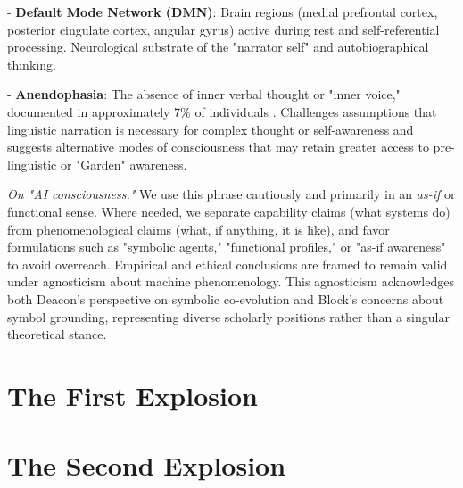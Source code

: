 \documentclass[12pt,letterpaper]{book}
\begin{document}
- \textbf{Default Mode Network (DMN)}: Brain regions (medial prefrontal cortex, posterior cingulate cortex, angular gyrus) active during rest and self-referential processing. Neurological substrate of the "narrator self" and autobiographical thinking.

- \textbf{Anendophasia}: The absence of inner verbal thought or "inner voice," documented in approximately 7\% of individuals \parencite{nedergaard2021inner}. Challenges assumptions that linguistic narration is necessary for complex thought or self-awareness and suggests alternative modes of consciousness that may retain greater access to pre-linguistic or "Garden" awareness.

\textit{On "AI consciousness."} We use this phrase cautiously and primarily in an \textit{as-if} or functional sense. Where needed, we separate capability claims (what systems do) from phenomenological claims (what, if anything, it is like), and favor formulations such as "symbolic agents," "functional profiles," or "as-if awareness" to avoid overreach. Empirical and ethical conclusions are framed to remain valid under agnosticism about machine phenomenology. This agnosticism acknowledges both Deacon's perspective \parencite{deacon1997symbolic} on symbolic co-evolution and Block's concerns \parencite{block2023ai} about symbol grounding, representing diverse scholarly positions rather than a singular theoretical stance.

\part{The First Explosion}

\fancyhead[LO]{}

















\part{The Second Explosion}
\end{document}
